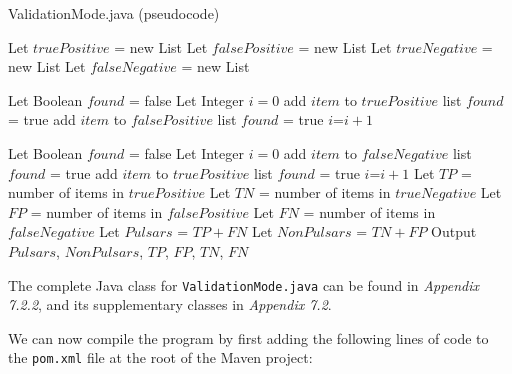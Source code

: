 \documentclass{article}
\begin{document}
\begin{algorithm}[H]
    \caption{ValidationMode.java (pseudocode)}
    \begin{algorithmic}
        \State Let $truePositive$ = new List
        \State Let $falsePositive$ = new List
        \State Let $trueNegative$ = new List
        \State Let $falseNegative$ = new List
        
            \State Let Boolean $found$ = false
            \State Let Integer $i=0$
                    \State add $item$ to $truePositive$ list
                    \State $found$ = true
                    \State add $item$ to $falsePositive$ list
                    \State $found$ = true
                \Else
                    \State $i$=$i+1$
                \EndIf
            \EndWhile
        \EndFor

            \State Let Boolean $found$ = false
            \State Let Integer $i=0$
                    \State add $item$ to $falseNegative$ list
                    \State $found$ = true
                    \State add $item$ to $truePositive$ list
                    \State $found$ = true
                \Else
                    \State $i$=$i+1$
                \EndIf
            \EndWhile
        \EndFor
        \State Let $TP$ = number of items in $truePositive$
        \State Let $TN$ = number of items in $trueNegative$
        \State Let $FP$ = number of items in $falsePositive$
        \State Let $FN$ = number of items in $falseNegative$
        \State Let $Pulsars$ = $TP+FN$
        \State Let $NonPulsars$ = $TN+FP$
        \State Output $Pulsars$, $NonPulsars$, $TP$, $FP$, $TN$, $FN$
    \end{algorithmic}
\end{algorithm}

The complete Java class for \verb|ValidationMode.java| can be found in \emph{Appendix 7.2.2}, and its supplementary classes in \emph{Appendix 7.2}.

We can now compile the program by first adding the following lines of code to the \verb|pom.xml| file at the root of the Maven project:
\end{document}
